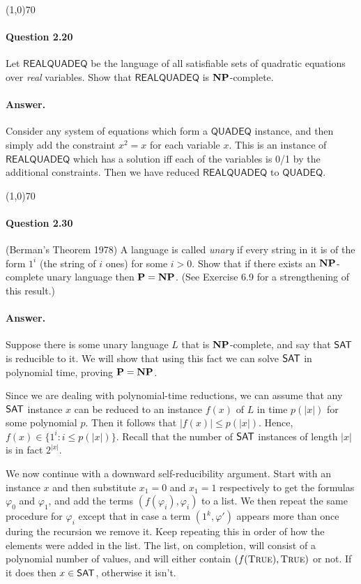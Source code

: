 \begin{center}
	\line(1,0){70}
\end{center}

\paragraph{Question 2.20} Let $\mathsf{REALQUADEQ}$ be the language of all satisfiable sets of quadratic equations over \textit{real} variables. Show that $\mathsf{REALQUADEQ}$ is $\mathbf{NP}$-complete.

\paragraph{Answer.} Consider any system of equations which form a $\mathsf{QUADEQ}$ instance, and then simply add the constraint $x^2=x$ for each variable $x$. This is an instance of $\mathsf{REALQUADEQ}$ which has a solution iff each of the variables is 0/1 by the additional constraints. Then we have reduced $\mathsf{REALQUADEQ}$ to $\mathsf{QUADEQ}$.

\begin{center}
	\line(1,0){70}
\end{center}

\paragraph{Question 2.30} (Berman's Theorem 1978) A language is called \textit{unary} if every string in it is of the form $1^i$ (the string of $i$ ones) for some $i>0$. Show that if there exists an $\mathbf{NP}$-complete unary language then $\mathbf{P}=\mathbf{NP}$. (See Exercise 6.9 for a strengthening of this result.)

\paragraph{Answer.} Suppose there is some unary language $L$ that is $\mathbf{NP}$-complete, and say that $\mathsf{SAT}$ is reducible to it. We will show that using this fact we can solve $\mathsf{SAT}$ in polynomial time, proving $\mathbf{P}=\mathbf{NP}$.

Since we are dealing with polynomial-time reductions, we can assume that any $\mathsf{SAT}$ instance $x$ can be reduced to an instance $f(x)$ of $L$ in time $p(|x|)$ for some polynomial $p$. Then it follows that $|f(x)|\leq p(|x|)$. Hence, $f(x)\in\{1^i:i\leq p(|x|)\}$. Recall that the number of $\mathsf{SAT}$ instances of length $|x|$ is in fact $2^{|x|}$.

We now continue with a downward self-reducibility argument. Start with an instance $x$ and then substitute $x_1=0$ and $x_1=1$ respectively to get the formulas $\varphi_0$ and $\varphi_1$, and add the terms $(f(\varphi_i), \varphi_i)$ to a list. We then repeat the same procedure for $\varphi_i$ except that in case a term $(1^k, \varphi')$ appears more than once during the recursion we remove it. Keep repeating this in order of how the elements were added in the list. The list, on completion, will consist of a polynomial number of values, and will either contain $(f(\textsc{True}),\textsc{True})$ or not. If it does then $x\in\mathsf{SAT}$, otherwise it isn't.

